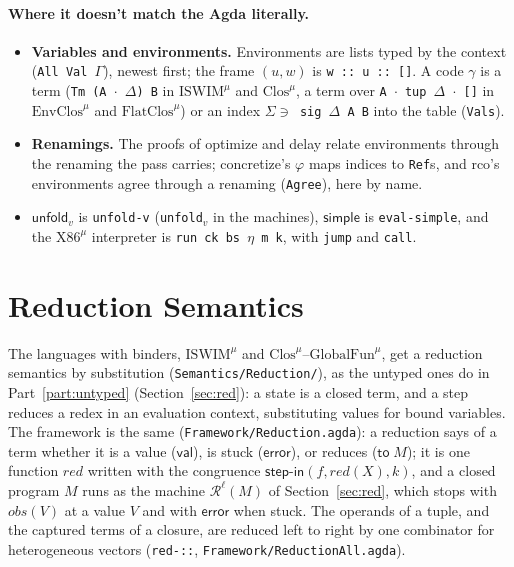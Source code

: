 \documentclass[10pt]{article}
\theoremstyle{acmplain}
\newcommand{\key}[1]{\mathsf{#1}}
\newcommand{\error}{\key{error}}
\newcommand{\obs}{\mathit{obs}}
\newcommand{\Ml}[1]{\textrm{#1}^{\mu}}                  %
\begin{document}
\paragraph{Where it doesn't match the Agda literally.}
\begin{itemize}
\item \textbf{Variables and environments.} Environments are lists typed by
  the context (\texttt{All Val $\Gamma$}), newest first; the frame $(u, w)$
  is \texttt{w :: u :: []}. A code $\gamma$ is a term (\texttt{Tm (A $\cdot$
  $\Delta$) B} in $\Ml{ISWIM}$ and $\Ml{Clos}$, a term over \texttt{A $\cdot$
  tup $\Delta$ $\cdot$ []} in $\Ml{EnvClos}$ and $\Ml{FlatClos}$) or an index
  \texttt{$\Sigma \ni$ sig $\Delta$ A B} into the table (\texttt{Vals}).
\item \textbf{Renamings.} The proofs of optimize and delay relate
  environments through the renaming the pass carries; concretize's
  $\varphi$ maps indices to \texttt{Ref}s, and rco's environments agree
  through a renaming (\texttt{Agree}), here by name.
\item \textbf{$\key{unfold}_v$} is \texttt{unfold-v} (\texttt{unfold$_v$} in
  the machines), $\key{simple}$ is \texttt{eval-simple}, and the $\Ml{X86}$
  interpreter is \texttt{run ck bs $\eta$ m k}, with \texttt{jump} and
  \texttt{call}.
\end{itemize}
\section{Reduction Semantics}\label{sec:m-red}

The languages with binders, $\Ml{ISWIM}$ and $\Ml{Clos}$--$\Ml{GlobalFun}$, get a
reduction semantics by substitution (\texttt{Semantics/Reduction/}), as the
untyped ones do in Part~\ref{part:untyped} (Section~\ref{sec:red}): a state
is a closed term, and a step reduces a redex in an evaluation context,
substituting values for bound variables. The framework is the same
(\texttt{Framework/Reduction.agda}): a reduction says of a term whether it
is a value ($\key{val}$), is stuck ($\error$), or reduces ($\key{to}\;M$); it
is one function $\mathit{red}$ written with the congruence
$\key{step\text{-}in}(f, \mathit{red}(X), k)$, and a closed program $M$ runs
as the machine $\mathcal{R}^{\ell}(M)$ of Section~\ref{sec:red}, which stops
with $\obs(V)$ at a value $V$ and with $\error$ when stuck. The operands of
a tuple, and the captured terms of a closure, are reduced left to right by
one combinator for heterogeneous vectors (\texttt{red-::},
\texttt{Framework/ReductionAll.agda}).
\end{document}
